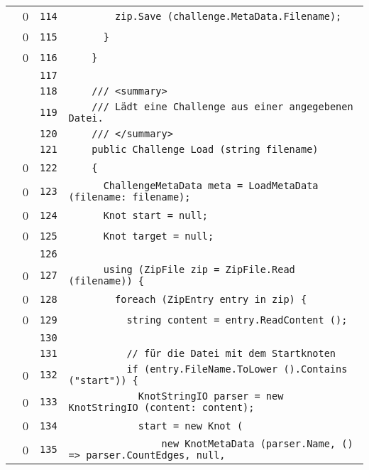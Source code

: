 \documentclass[a4paper,10pt]{article}
\begin{document}
\begin{longtable}[l]{lrrl}
\cellcolor{red} & 0 & \verb~114~ & \verb~        zip.Save (challenge.MetaData.Filename);~\\
\cellcolor{red} & 0 & \verb~115~ & \verb~      }~\\
\cellcolor{red} & 0 & \verb~116~ & \verb~    }~\\
\cellcolor{gray} &  & \verb~117~ & \verb~~\\
\cellcolor{gray} &  & \verb~118~ & \verb~    /// <summary>~\\
\cellcolor{gray} &  & \verb~119~ & \verb~    /// Lädt eine Challenge aus einer angegebenen Datei.~\\
\cellcolor{gray} &  & \verb~120~ & \verb~    /// </summary>~\\
\cellcolor{gray} &  & \verb~121~ & \verb~    public Challenge Load (string filename)~\\
\cellcolor{red} & 0 & \verb~122~ & \verb~    {~\\
\cellcolor{red} & 0 & \verb~123~ & \verb~      ChallengeMetaData meta = LoadMetaData (filename: filename);~\\
\cellcolor{red} & 0 & \verb~124~ & \verb~      Knot start = null;~\\
\cellcolor{red} & 0 & \verb~125~ & \verb~      Knot target = null;~\\
\cellcolor{gray} &  & \verb~126~ & \verb~~\\
\cellcolor{red} & 0 & \verb~127~ & \verb~      using (ZipFile zip = ZipFile.Read (filename)) {~\\
\cellcolor{red} & 0 & \verb~128~ & \verb~        foreach (ZipEntry entry in zip) {~\\
\cellcolor{red} & 0 & \verb~129~ & \verb~          string content = entry.ReadContent ();~\\
\cellcolor{gray} &  & \verb~130~ & \verb~~\\
\cellcolor{gray} &  & \verb~131~ & \verb~          // für die Datei mit dem Startknoten~\\
\cellcolor{red} & 0 & \verb~132~ & \verb~          if (entry.FileName.ToLower ().Contains ("start")) {~\\
\cellcolor{red} & 0 & \verb~133~ & \verb~            KnotStringIO parser = new KnotStringIO (content: content);~\\
\cellcolor{red} & 0 & \verb~134~ & \verb~            start = new Knot (~\\
\cellcolor{red} & 0 & \verb~135~ & \verb~                new KnotMetaData (parser.Name, () => parser.CountEdges, null, ~\\

\end{longtable}
\end{document}
